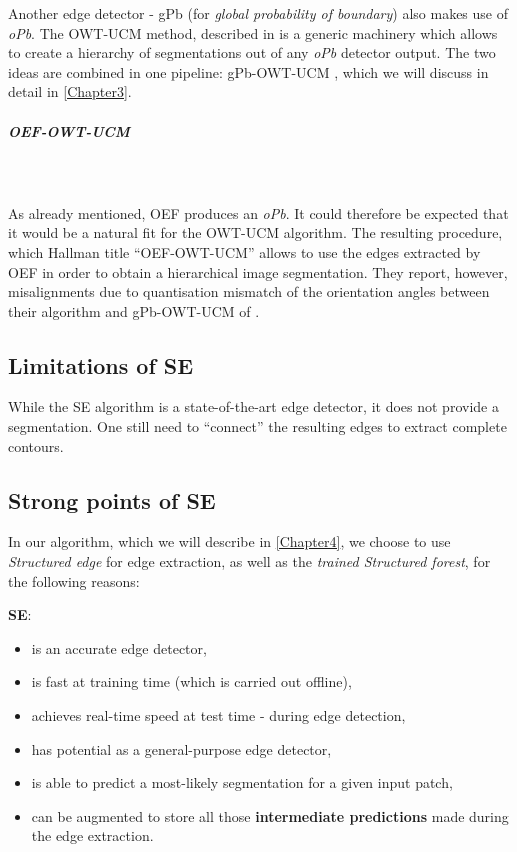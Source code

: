 Another edge detector - gPb (for {\it global probability of boundary}) \cite{Maire2008using} also makes use of {\it oPb}. The OWT-UCM method, described in \cite{Arbelaez09} is a generic machinery which allows to create a hierarchy of segmentations out of any {\it oPb} detector output. The two ideas are combined in one pipeline: gPb-OWT-UCM \cite{Arbelaez11}, which we will discuss %
in detail in \cref{Chapter3}. 

\subparagraph{OEF-OWT-UCM}\mbox{}\\\mbox{}\\
As already mentioned, OEF produces an {\it oPb}. It could therefore be expected that it would be a natural fit for the OWT-UCM algorithm. The resulting procedure, which Hallman \etal title ``OEF-OWT-UCM'' allows to use the edges extracted by OEF %
in order to obtain a hierarchical image segmentation. They report, however, misalignments due to quantisation mismatch of the orientation angles between their algorithm and gPb-OWT-UCM of \cite{Arbelaez11}.

\subsection{Limitations of SE}
While the SE algorithm is a state-of-the-art edge detector, it does not provide a segmentation. One still need to ``connect'' the resulting edges to extract complete contours. %


\subsection{Strong points of SE}
In our algorithm, which we will describe in \cref{Chapter4}, we choose to use {\it Structured edge} for edge extraction, as well as %
the {\it trained Structured forest}, for the following reasons:

{\bf SE}:
\begin{itemize}
 \item is an accurate edge detector,
 \item is fast at training time (which is carried out %
 offline),
 \item achieves real-time speed at test time - during edge detection,
 \item has potential as a general-purpose edge detector, %
 \item is able to predict a most-likely segmentation for a given input patch,
 \item can be augmented to store all those {\bf intermediate predictions} made during the edge extraction.
\end{itemize}

